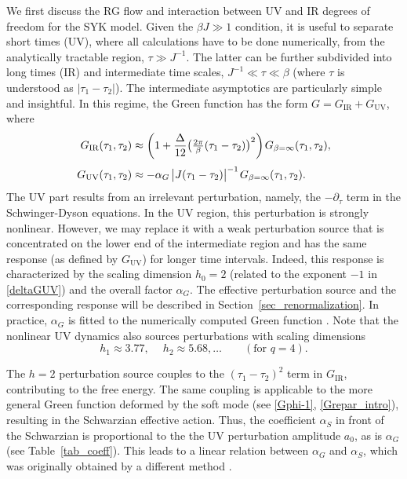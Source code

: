 \documentclass[12pt]{article}
\newcommand{\IR}{\text{IR}}
\newcommand{\UV}{\text{UV}}
\begin{document}
We first discuss the RG flow and interaction between UV and IR degrees of freedom for the SYK model. Given the $\beta J\gg 1$ condition, it is useful to separate short times (UV), where all calculations have to be done numerically, from the analytically tractable region, $\tau\gg J^{-1}$. The latter can be further subdivided into long times (IR) and intermediate time scales, $J^{-1}\ll\tau\ll\beta$ (where $\tau$ is understood as $|\tau_1-\tau_2|$). The intermediate asymptotics are particularly simple and insightful. In this regime, the Green function has the form $G=G_{\IR}+G_{\UV}$, where
\begin{align}
G_{\IR}(\tau_1,\tau_2) &
\approx\biggl(1+\frac{\Delta}{12}
\bigl(\tfrac{2\pi}{\beta}(\tau_1-\tau_2)\bigr)^2\biggr)\kern1pt
G_{\beta=\infty}(\tau_1,\tau_2),
\\[3pt]
\label{deltaGUV}
G_{\UV}(\tau_1,\tau_2) &
\approx -\alpha_{G}\,\bigl|J(\tau_1-\tau_2)\bigr|^{-1}\kern1pt
G_{\beta=\infty}(\tau_1,\tau_2).
\end{align}
The UV part results from an irrelevant perturbation, namely, the $-\partial_{\tau}$ term in the Schwinger-Dyson equations. In the UV region, this perturbation is strongly nonlinear. However, we may replace it with a weak perturbation source that is concentrated on the lower end of the intermediate region and has the same response (as defined by $G_{\UV}$) for longer time intervals. Indeed, this response is characterized by the scaling dimension $h_0=2$ (related to the exponent $-1$ in \eqref{deltaGUV}) and the overall factor $\alpha_{G}$. The effective perturbation source and the corresponding response will be described in Section~\ref{sec_renormalization}. In practice, $\alpha_{G}$ is fitted to the numerically computed Green function \cite{MS16}. Note that the nonlinear UV dynamics also sources perturbations with scaling dimensions 
\begin{equation}
h_1\approx 3.77,\quad\: h_2 \approx 5.68,\ldots\qquad (\text{for } q=4).
\end{equation}

The $h=2$ perturbation source couples to the $(\tau_1-\tau_2)^2$ term in $G_{\IR}$, contributing to the free energy. The same coupling is applicable to the more general Green function deformed by the soft mode (see \eqref{Gphi-1}, \eqref{Grepar_intro}), resulting in the Schwarzian effective action. Thus, the coefficient $\alpha_S$ in front of the Schwarzian is proportional to the the UV perturbation amplitude $a_0$, as is $\alpha_G$ (see Table~\ref{tab_coeff}). This leads to a linear relation between $\alpha_G$ and $\alpha_S$, which was originally obtained by a different method \cite{MS16}.
\end{document}
